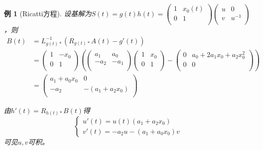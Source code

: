 \documentclass[winfonts,UTF8,c5size,a4paper,fancyhdr,hyperref,titlepage,nocap]{ctexart}
\newtheorem{exa}[thm]{例}
\theoremstyle{definition}
\theoremstyle{remark}
\numberwithin{equation}{subsection}
\begin{document}
\begin{exa}[Ricatti方程]
设基解为$S(t)=g(t)h(t)=\begin{pmatrix}
                     1 & x_0(t) \\
                     0 & 1 \\
                   \end{pmatrix}\begin{pmatrix}
                    u & 0 \\
                    v & u^{-1} \\
                  \end{pmatrix}$，则
\begin{align*}
  B(t)&=L^{-1}_{g(t)\ast}(R_{g(t)\ast}A(t)-g'(t))\\
       &=\begin{pmatrix}
                     1 & -x_0 \\
                     0 & 1 \\
                   \end{pmatrix}
            \left(\begin{pmatrix}
               a_1 & a_0 \\
               -a_2 & -a_1 \\
             \end{pmatrix}
                 \begin{pmatrix}
                     1 & x_0 \\
                     0 & 1 \\
                   \end{pmatrix}
             -\begin{pmatrix}
                     0 & a_0+2a_1x_0+a_2x_0^2 \\
                     0 & 0 \\
                   \end{pmatrix}
            \right)\\
       &=\begin{pmatrix}
               a_1+a_0x_0 & 0 \\
               -a_2 & -(a_1+a_2x_0) \\
             \end{pmatrix}
\end{align*}

由$h'(t)=R_{h(t)\ast}B(t)$得
\begin{equation*}
\begin{cases}
u'(t)=u(t)(a_1+a_2x_0)\\
v'(t)=-a_2u-(a_1+a_0x_0)v
\end{cases}
\end{equation*}
可见$u,v$可积。
\end{exa}
\end{document}
